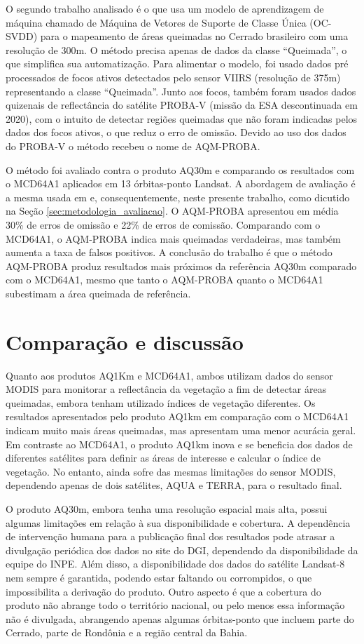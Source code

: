 \documentclass[cic,tc]{iiufrgs}
\begin{document}
O segundo trabalho analisado é o \citet{pereira2017burned} que usa um modelo de aprendizagem de máquina chamado de Máquina de Vetores de Suporte de Classe Única (OC-SVDD) para o mapeamento de áreas queimadas no Cerrado brasileiro com uma resolução de 300m. O método precisa apenas de dados da classe ``Queimada'', o que simplifica sua automatização. Para alimentar o modelo, foi usado dados pré processados de focos ativos detectados pelo sensor VIIRS (resolução de 375m) representando a classe ``Queimada''. Junto aos focos, também foram usados dados quizenais de reflectância do satélite PROBA-V (missão da ESA descontinuada em 2020), com o intuito de detectar regiões queimadas que não foram indicadas pelos dados dos focos ativos, o que reduz o erro de omissão. Devido ao uso dos dados do PROBA-V o método recebeu o nome de AQM-PROBA.

O método foi avaliado contra o produto AQ30m e comparando os resultados com o MCD64A1 aplicados em 13 órbitas-ponto Landsat. A abordagem de avaliação é a mesma usada em \citet{libonati2015algorithm} e, consequentemente, neste presente trabalho, como dicutido na Seção \ref{sec:metodologia_avaliacao}. O AQM-PROBA apresentou em média 30\% de erros de omissão e 22\% de erros de comissão. Comparando com o MCD64A1, o AQM-PROBA indica mais queimadas verdadeiras, mas também aumenta a taxa de falsos positivos. A conclusão do trabalho é que o método AQM-PROBA produz resultados mais próximos da referência AQ30m comparado com o MCD64A1, mesmo que tanto o AQM-PROBA quanto o MCD64A1 subestimam a área queimada de referência.

\section*{Comparação e discussão}

Quanto aos produtos AQ1Km e MCD64A1, ambos utilizam dados do sensor MODIS para monitorar a reflectância da vegetação a fim de detectar áreas queimadas, embora tenham utilizado índices de vegetação diferentes. Os resultados apresentados pelo produto AQ1km em comparação com o MCD64A1 indicam muito mais áreas queimadas, mas apresentam uma menor acurácia geral. Em contraste ao MCD64A1, o produto AQ1km inova e se beneficia dos dados de diferentes satélites para definir as áreas de interesse e calcular o índice de vegetação. No entanto, ainda sofre das mesmas limitações do sensor MODIS, dependendo apenas de dois satélites, AQUA e TERRA, para o resultado final.

O produto AQ30m, embora tenha uma resolução espacial mais alta, possui algumas limitações em relação à sua disponibilidade e cobertura. A dependência de intervenção humana para a publicação final dos resultados pode atrasar a divulgação periódica dos dados no site do DGI, dependendo da disponibilidade da equipe do INPE. Além disso, a disponibilidade dos dados do satélite Landsat-8 nem sempre é garantida, podendo estar faltando ou corrompidos, o que impossibilita a derivação do produto. Outro aspecto é que a cobertura do produto não abrange todo o território nacional, ou pelo menos essa informação não é divulgada, abrangendo apenas algumas órbitas-ponto que incluem parte do Cerrado, parte de Rondônia e a região central da Bahia.
\end{document}
